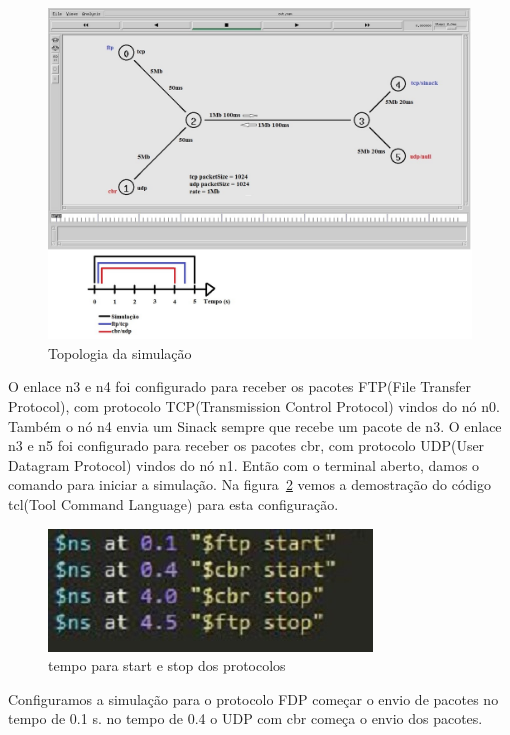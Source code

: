 \documentclass[12pt]{article}
\begin{document}
\begin{figure}[ht]
\centering
\includegraphics[width=.9\textwidth]{simulador_ns2.jpg}
\caption { Topologia da simulação}
\label{fig:topologia}
\end{figure}

O enlace n3 e n4 foi configurado para receber os pacotes FTP(File Transfer Protocol), com protocolo TCP(Transmission Control Protocol) vindos do nó n0. Também o nó n4 envia um Sinack sempre que recebe um pacote de n3.
O enlace n3 e n5 foi configurado para receber os pacotes cbr, com protocolo UDP(User Datagram Protocol) vindos do nó n1.
Então com o terminal aberto, damos o comando para iniciar a simulação. Na figura~\ref{fig:tcl} vemos a demostração do código tcl(Tool Command Language) para esta configuração.

\begin{figure}[ht]
\centering
\includegraphics[width=.9\textwidth]{tcl.jpg}
\caption { tempo para start e stop dos protocolos}
\label{fig:tcl}
\end{figure}

Configuramos a simulação para o protocolo FDP começar o envio de pacotes no tempo de 0.1 s. no tempo de 0.4 o UDP com cbr começa o envio dos pacotes.
\end{document}
